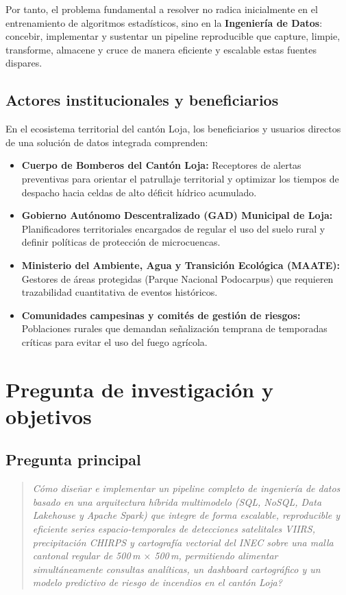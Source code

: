 \documentclass[11pt,a4paper]{article}
\begin{document}
Por tanto, el problema fundamental a resolver no radica inicialmente en el entrenamiento de algoritmos estad\'isticos, sino en la \textbf{Ingenier\'ia de Datos}: concebir, implementar y sustentar un pipeline reproducible que capture, limpie, transforme, almacene y cruce de manera eficiente y escalable estas fuentes dispares.

\subsection{Actores institucionales y beneficiarios}
En el ecosistema territorial del cant\'on Loja, los beneficiarios y usuarios directos de una soluci\'on de datos integrada comprenden:
\begin{itemize}
    \item \textbf{Cuerpo de Bomberos del Cant\'on Loja:} Receptores de alertas preventivas para orientar el patrullaje territorial y optimizar los tiempos de despacho hacia celdas de alto d\'eficit h\'idrico acumulado.
    \item \textbf{Gobierno Aut\'onomo Descentralizado (GAD) Municipal de Loja:} Planificadores territoriales encargados de regular el uso del suelo rural y definir pol\'iticas de protecci\'on de microcuencas.
    \item \textbf{Ministerio del Ambiente, Agua y Transici\'on Ecol\'ogica (MAATE):} Gestores de \'areas protegidas (Parque Nacional Podocarpus) que requieren trazabilidad cuantitativa de eventos hist\'oricos.
    \item \textbf{Comunidades campesinas y comit\'es de gesti\'on de riesgos:} Poblaciones rurales que demandan se\~nalizaci\'on temprana de temporadas cr\'iticas para evitar el uso del fuego agr\'icola.
\end{itemize}

\section{Pregunta de investigaci\'on y objetivos}

\subsection{Pregunta principal}
\begin{quote}
\textit{\textquestiondown C\'omo dise\~nar e implementar un pipeline completo de ingenier\'ia de datos basado en una arquitectura h\'ibrida multimodelo (SQL, NoSQL, Data Lakehouse y Apache Spark) que integre de forma escalable, reproducible y eficiente series espacio-temporales de detecciones satelitales VIIRS, precipitaci\'on CHIRPS y cartograf\'ia vectorial del INEC sobre una malla cantonal regular de 500\,m $\times$ 500\,m, permitiendo alimentar simult\'aneamente consultas anal\'iticas, un dashboard cartogr\'afico y un modelo predictivo de riesgo de incendios en el cant\'on Loja?}
\end{quote}
\end{document}
